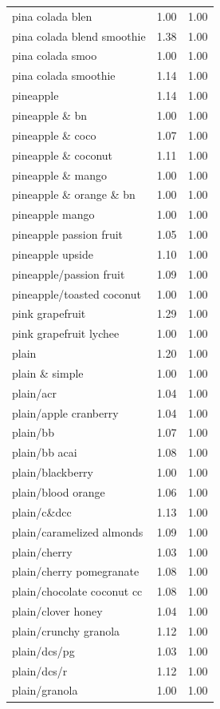 \begin{table}
\begin{tabular}{lrr}
pina colada blen & 1.00 & 1.00 \\
pina colada blend smoothie & 1.38 & 1.00 \\
pina colada smoo & 1.00 & 1.00 \\
pina colada smoothie & 1.14 & 1.00 \\
pineapple & 1.14 & 1.00 \\
pineapple \& bn & 1.00 & 1.00 \\
pineapple \& coco & 1.07 & 1.00 \\
pineapple \& coconut & 1.11 & 1.00 \\
pineapple \& mango & 1.00 & 1.00 \\
pineapple \& orange \& bn & 1.00 & 1.00 \\
pineapple mango & 1.00 & 1.00 \\
pineapple passion fruit & 1.05 & 1.00 \\
pineapple upside & 1.10 & 1.00 \\
pineapple/passion fruit & 1.09 & 1.00 \\
pineapple/toasted coconut & 1.00 & 1.00 \\
pink grapefruit & 1.29 & 1.00 \\
pink grapefruit lychee & 1.00 & 1.00 \\
plain & 1.20 & 1.00 \\
plain \& simple & 1.00 & 1.00 \\
plain/acr & 1.04 & 1.00 \\
plain/apple cranberry & 1.04 & 1.00 \\
plain/bb & 1.07 & 1.00 \\
plain/bb acai & 1.08 & 1.00 \\
plain/blackberry & 1.00 & 1.00 \\
plain/blood orange & 1.06 & 1.00 \\
plain/c\&dcc & 1.13 & 1.00 \\
plain/caramelized almonds & 1.09 & 1.00 \\
plain/cherry & 1.03 & 1.00 \\
plain/cherry pomegranate & 1.08 & 1.00 \\
plain/chocolate coconut cc & 1.08 & 1.00 \\
plain/clover honey & 1.04 & 1.00 \\
plain/crunchy granola & 1.12 & 1.00 \\
plain/dcs/pg & 1.03 & 1.00 \\
plain/dcs/r & 1.12 & 1.00 \\
plain/granola & 1.00 & 1.00 \\

\end{tabular}
\end{table}
